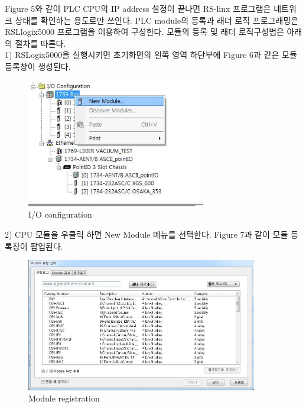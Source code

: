 \documentclass[11pt
  , a4paper
  , article
  , oneside
]{memoir}
\begin{document}
 \newpage 
 
 Figure 5와 같이 PLC CPU의 IP address 설정이 끝나면 RS-linx 프로그램은 네트워크 상태를 확인하는 용도로만 쓰인다. PLC module의 등록과 래더 로직 프로그래밍은 RSLlogix5000 프로그램을 이용하여 구성한다. 모듈의 등록 및 래더 로직구성법은 아래의 절차를 따른다.\\
 
 1) RSLogix5000을 실행시키면 초기화면의 왼쪽 영역 하단부에 Figure 6과 같은 모듈 등록창이 생성된다.\\
 
  \begin{figure}[!htb]
  	\centering
  	\includegraphics[width=0.7\textwidth]{./picture/module_regi.JPG}
  	\caption{
  		I/O configuration
  	}
  	\label{fig:}
  \end{figure} 
2) CPU 모듈을 우클릭 하면 New Module 메뉴를 선택한다. Figure 7과 같이 모듈 등록창이 팝업된다.\\
 
 \begin{figure}[!htb]
 	\centering
 	\includegraphics[width=0.9\textwidth]{./picture/module_search.JPG}
 	\caption{
 		Module registration
 	}
 	\label{fig:}
 \end{figure}  
 
\end{document}
